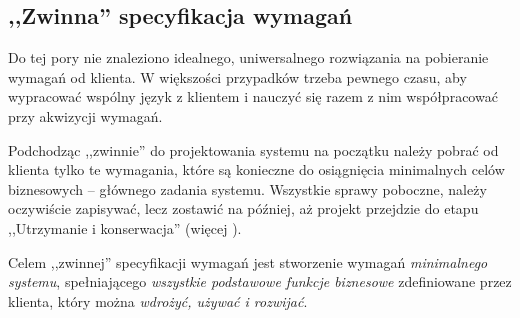 \subsection{,,Zwinna'' specyfikacja wymagań}
\label{cha:ZMTOzwinnaSpecyfikacjaWymagan}

%
Do tej pory nie znaleziono idealnego, uniwersalnego rozwiązania na pobieranie wymagań od klienta. W większości przypadków trzeba pewnego czasu, aby wypracować wspólny język z klientem i nauczyć się razem z nim współpracować przy akwizycji wymagań.

Podchodząc ,,zwinnie'' do projektowania systemu na początku należy pobrać od klienta tylko te wymagania, które są konieczne do osiągnięcia minimalnych celów biznesowych -- głównego zadania systemu. Wszystkie sprawy poboczne, należy oczywiście zapisywać, lecz zostawić na później, aż projekt przejdzie do etapu ,,Utrzymanie i konserwacja'' (więcej ).

Celem ,,zwinnej'' specyfikacji wymagań jest stworzenie wymagań \emph{minimalnego systemu}, spełniającego \emph{wszystkie podstawowe funkcje biznesowe} zdefiniowane przez klienta, który można \emph{wdrożyć, używać i rozwijać}.


